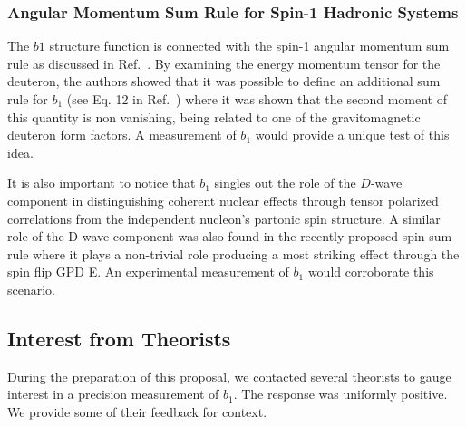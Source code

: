 \subsubsection{Angular Momentum Sum Rule for Spin-1 Hadronic Systems}

The $b1$ structure function is connected with the spin-1 angular momentum sum rule as discussed in Ref.~\cite{Taneja:2011sy}.
By examining the energy momentum tensor for the deuteron, the authors showed that 
it was possible to define an additional sum rule for $b_1$ (see Eq. 12 in Ref.~\cite{Taneja:2011sy}) where it was shown that the second moment of this quantity is non vanishing, being related to one of the gravitomagnetic deuteron form factors.  A measurement of $b_1$ would provide a unique test of this idea.

It is also important to notice that $b_1$ singles out the role of the $D$-wave component in distinguishing coherent nuclear effects through tensor polarized correlations  from  the independent nucleon's partonic spin structure.
A similar role of the D-wave component was also found in the recently proposed spin sum rule where it plays a non-trivial role
producing a most striking effect through the spin flip GPD E. An experimental measurement of $b_1$ would corroborate this scenario.



\newpage
\subsection{Interest from Theorists}
%
During the preparation of this proposal, we contacted several theorists 
to gauge interest in a precision measurement of $b_1$.  The response was uniformly positive.  We 
provide some of their feedback for context.
%
%

